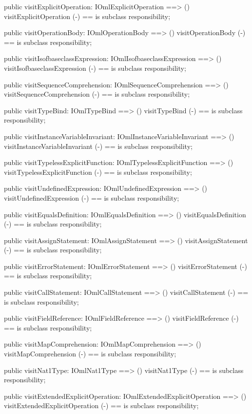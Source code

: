 \begin{vdm_al}
  public visitExplicitOperation: IOmlExplicitOperation ==> ()
  visitExplicitOperation (-) == is subclass responsibility;

  public visitOperationBody: IOmlOperationBody ==> ()
  visitOperationBody (-) == is subclass responsibility;

  public visitIsofbaseclassExpression: IOmlIsofbaseclassExpression ==> ()
  visitIsofbaseclassExpression (-) == is subclass responsibility;

  public visitSequenceComprehension: IOmlSequenceComprehension ==> ()
  visitSequenceComprehension (-) == is subclass responsibility;

  public visitTypeBind: IOmlTypeBind ==> ()
  visitTypeBind (-) == is subclass responsibility;

  public visitInstanceVariableInvariant: IOmlInstanceVariableInvariant ==> ()
  visitInstanceVariableInvariant (-) == is subclass responsibility;

  public visitTypelessExplicitFunction: IOmlTypelessExplicitFunction ==> ()
  visitTypelessExplicitFunction (-) == is subclass responsibility;

  public visitUndefinedExpression: IOmlUndefinedExpression ==> ()
  visitUndefinedExpression (-) == is subclass responsibility;

  public visitEqualsDefinition: IOmlEqualsDefinition ==> ()
  visitEqualsDefinition (-) == is subclass responsibility;

  public visitAssignStatement: IOmlAssignStatement ==> ()
  visitAssignStatement (-) == is subclass responsibility;

  public visitErrorStatement: IOmlErrorStatement ==> ()
  visitErrorStatement (-) == is subclass responsibility;

  public visitCallStatement: IOmlCallStatement ==> ()
  visitCallStatement (-) == is subclass responsibility;

  public visitFieldReference: IOmlFieldReference ==> ()
  visitFieldReference (-) == is subclass responsibility;

  public visitMapComprehension: IOmlMapComprehension ==> ()
  visitMapComprehension (-) == is subclass responsibility;

  public visitNat1Type: IOmlNat1Type ==> ()
  visitNat1Type (-) == is subclass responsibility;

  public visitExtendedExplicitOperation: IOmlExtendedExplicitOperation ==> ()
  visitExtendedExplicitOperation (-) == is subclass responsibility;


\end{vdm_al}
